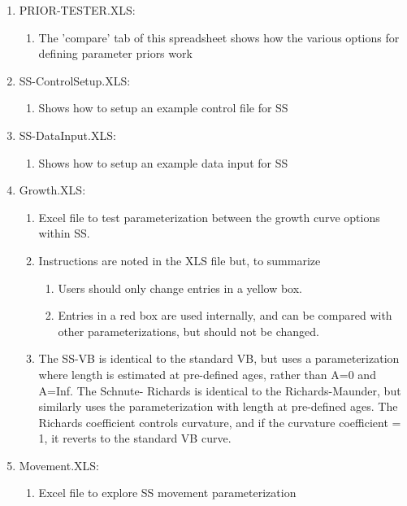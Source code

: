 \begin{enumerate}
\begin{enumerate}
		\end{enumerate}
		\item PRIOR-TESTER.XLS:
		\begin{enumerate}
			\item The 'compare' tab of this spreadsheet shows how the various options for defining parameter priors work
		\end{enumerate}
		\item SS-Control\textunderscore Setup.XLS:
		\begin{enumerate}
			\item Shows how to setup an example control file for SS
		\end{enumerate}
		\item SS-Data\textunderscore Input.XLS:
		\begin{enumerate}
			\item Shows how to setup an example data input for SS
		\end{enumerate}
		\item Growth.XLS: 
		\begin{enumerate}
			\item Excel file to test parameterization between the growth curve options within SS.
			\item Instructions are noted in the XLS file but, to summarize
			\begin{enumerate}
				\item Users should only change entries in a yellow box.  
				\item Entries in a red box are used internally, and can be compared with other parameterizations, but should not be changed.
			\end{enumerate}
			\item The SS-VB is identical to the standard VB, but uses a parameterization where length is estimated at pre-defined ages, rather than A=0 and A=Inf.  The Schnute- Richards is identical to the Richards-Maunder, but similarly uses the parameterization with length at pre-defined ages.  The Richards coefficient controls curvature, and if the curvature coefficient = 1, it reverts to the standard VB curve. 
		\end{enumerate}
		\item Movement.XLS:
		\begin{enumerate}
			\item Excel file to explore SS movement parameterization
		\end{enumerate}
	\end{enumerate}
		
